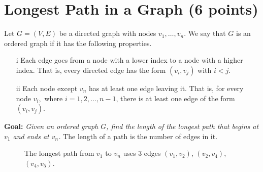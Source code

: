\documentclass[letter,11pt]{article}
\begin{document}
\newpage

\section{Longest Path in a Graph (6 points)}

Let $G=(V,E)$ be a directed graph with nodes $v_1,\dots,v_n$. We say that $G$ is an ordered graph if it has the following properties.

\begin{enumerate}
    \item [i] Each edge goes from a node with a lower index to a node with a higher index. That is, every directed edge has the form $(v_i,v_j)$ with $i<j$.
    \item [ii] Each node except $v_n$ has at least one edge leaving it. That is, for every node $v_i,$ where $i=1,2,\dots,n-1$, there is at least one edge of the form $(v_i,v_j)$.
\end{enumerate}

\textbf{Goal:} \textit{Given an ordered graph $G$, find the length of the longest path that begins at $v_1$ and ends at $v_n$.} The length of a path is the number of edges in it.

\begin{figure}[H]
  \centering
  \caption{The longest path from $v_1$ to $v_n$ uses 3 edges $(v_1,v_2)$, $(v_2, v_4)$, $(v_4, v_5)$.}
\end{figure}
\end{document}
